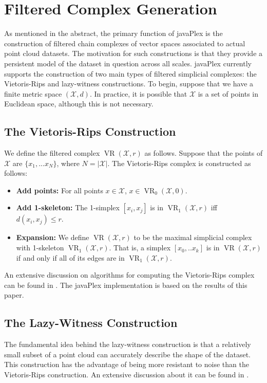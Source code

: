 \section{Filtered Complex Generation}

As mentioned in the abstract, the primary function of javaPlex is the construction of filtered chain complexes of vector spaces associated to actual point cloud datasets. The motivation for such constructions is that they provide a persistent model of the dataset in question across all scales. javaPlex currently supports the construction of two main types of filtered simplicial complexes: the Vietoris-Rips and lazy-witness constructions. To begin, suppose that we have a finite metric space $(\mathcal{X}, d)$. In practice, it is possible that $\mathcal{X}$ is a set of points in Euclidean space, although this is not necessary.

\subsection{The Vietoris-Rips Construction}
We define the filtered complex $\mathop{\mathrm{VR}} (\mathcal{X}, r)$ as follows. Suppose that the points of $\mathcal{X}$ are $\{x_1, ... x_N\}$, where $N = |\mathcal{X}|$. The Vietoris-Rips complex is constructed as follows:

\begin{itemize}
\item {\bf Add points:} For all points $x \in \mathcal{X}$, $x \in \mathop{\mathrm{VR}}_0(\mathcal{X}, 0)$.
\item {\bf Add 1-skeleton:} The 1-simplex $[x_i, x_j]$ is in $\mathop{\mathrm{VR}}_1(\mathcal{X}, r)$ iff $d(x_i, x_j) \leq r$.
\item {\bf Expansion:} We define $\mathop{\mathrm{VR}} (\mathcal{X}, r)$ to be the maximal simplicial complex with 1-skeleton $\mathop{\mathrm{VR}}_1(\mathcal{X}, r)$. That is, a simplex $[x_0, .. x_k]$ is in $\mathop{\mathrm{VR}} (\mathcal{X}, r)$ if and only if all of its edges are in $\mathop{\mathrm{VR}}_1(\mathcal{X}, r)$.
\end{itemize}

An extensive discussion on algorithms for computing the Vietoris-Rips complex can be found in \cite{Zomorodian}. The javaPlex implementation is based on the results of this paper.

\subsection{The Lazy-Witness Construction}
The fundamental idea behind the lazy-witness construction is that a relatively small subset of a point cloud can accurately describe the shape of the dataset. This construction has the advantage of being more resistant to noise than the Vietoris-Rips construction. An extensive discussion about it can be found in \cite{Witness}. 

